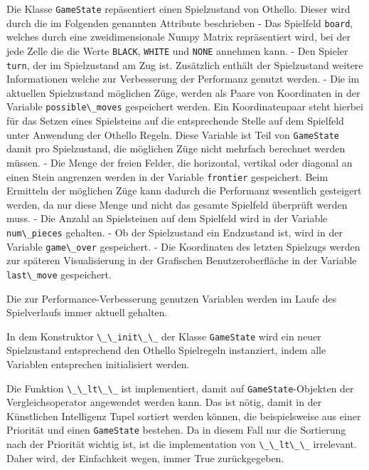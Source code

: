 Die Klasse \passthrough{\lstinline!GameState!} repäsentiert einen
Spielzustand von Othello. Dieser wird durch die im Folgenden genannten
Attribute beschrieben - Das Spielfeld \passthrough{\lstinline!board!},
welches durch eine zweidimensionale Numpy Matrix repräsentiert wird, bei
der jede Zelle die die Werte \passthrough{\lstinline!BLACK!},
\passthrough{\lstinline!WHITE!} und \passthrough{\lstinline!NONE!}
annehmen kann. - Den Spieler \passthrough{\lstinline!turn!}, der im
Spielzustand am Zug ist. Zusätzlich enthält der Spielzustand weitere
Informationen welche zur Verbesserung der Performanz genutzt werden. -
Die im aktuellen Spielzustand möglichen Züge, werden als Paare von
Koordinaten in der Variable \passthrough{\lstinline!possible\_moves!}
gespeichert werden. Ein Koordinatenpaar steht hierbei für das Setzen
eines Spielsteins auf die entsprechende Stelle auf dem Spielfeld unter
Anwendung der Othello Regeln. Diese Variable ist Teil von
\passthrough{\lstinline!GameState!} damit pro Spielzustand, die
möglichen Züge nicht mehrfach berechnet werden müssen. - Die Menge der
freien Felder, die horizontal, vertikal oder diagonal an einen Stein
angrenzen werden in der Variable \passthrough{\lstinline!frontier!}
gespeichert. Beim Ermitteln der möglichen Züge kann dadurch die
Performanz wesentlich gesteigert werden, da nur diese Menge und nicht
das gesamte Spielfeld überprüft werden muss. - Die Anzahl an
Spielsteinen auf dem Spielfeld wird in der Variable
\passthrough{\lstinline!num\_pieces!} gehalten. - Ob der Spielzustand
ein Endzustand ist, wird in der Variable
\passthrough{\lstinline!game\_over!} gespeichert. - Die Koordinaten des
letzten Spielzugs werden zur späteren Visualisierung in der Grafischen
Benutzeroberfläche in der Variable \passthrough{\lstinline!last\_move!}
gespeichert.

Die zur Performance-Verbesserung genutzen Variablen werden im Laufe des
Spielverlaufs immer aktuell gehalten.

In dem Konstruktor \passthrough{\lstinline!\_\_init\_\_!} der Klasse
\passthrough{\lstinline!GameState!} wird ein neuer Spielzustand
entsprechend den Othello Spielregeln instanziert, indem alle Variablen
entsprechen initialisiert werden.

Die Funktion \passthrough{\lstinline!\_\_lt\_\_!} ist implementiert,
damit auf \passthrough{\lstinline!GameState!}-Objekten der
Vergleichsoperator angewendet werden kann. Das ist nötig, damit in der
Künstlichen Intelligenz Tupel sortiert werden können, die beispielsweise
aus einer Priorität und einen \passthrough{\lstinline!GameState!}
bestehen. Da in diesem Fall nur die Sortierung nach der Priorität
wichtig ist, ist die implementation von
\passthrough{\lstinline!\_\_lt\_\_!} irrelevant. Daher wird, der
Einfachkeit wegen, immer True zurückgegeben.

